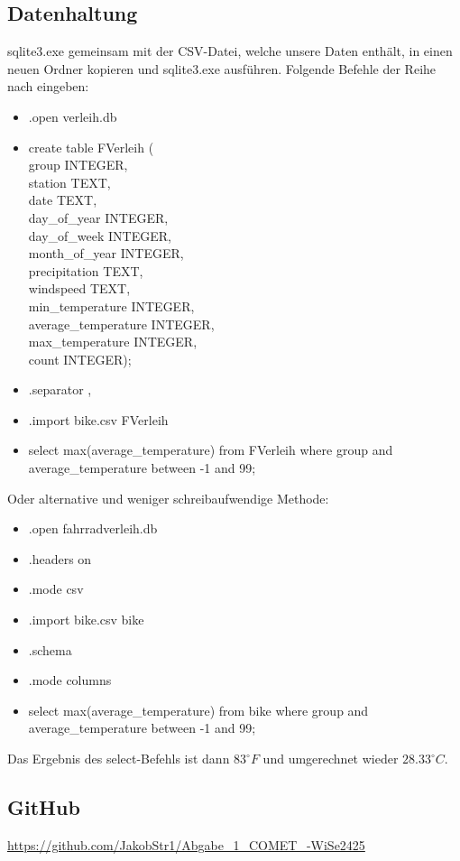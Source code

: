 \documentclass{article}
\begin{document}
\subsection{Datenhaltung}
sqlite3.exe gemeinsam mit der CSV-Datei, welche unsere Daten enthält, in einen neuen Ordner kopieren und  sqlite3.exe ausführen. Folgende Befehle der Reihe nach eingeben:
\begin{itemize}
    \item .open verleih.db
    \item create table FVerleih (\\ \dq group\dq{} INTEGER, \\station TEXT, \\date TEXT, \\day\_of\_year INTEGER, \\day\_of\_week INTEGER, \\month\_of\_year INTEGER, \\precipitation TEXT, \\windspeed TEXT, \\min\_temperature INTEGER, \\average\_temperature INTEGER, \\max\_temperature INTEGER, \\count INTEGER);
    \item .separator ,
    \item .import bike.csv FVerleih
    \item select max(average\_temperature) from FVerleih where \dq group and average\_temperature between -1 and 99;
\end{itemize} 
Oder alternative und weniger schreibaufwendige Methode:
\begin{itemize}
    \item .open fahrradverleih.db
    \item .headers on
    \item .mode csv
    \item .import bike.csv bike
    \item .schema
    \item .mode columns
    \item select max(average\_temperature) from bike where \dq group and \\average\_temperature between -1 and 99;
\end{itemize}
Das Ergebnis des select-Befehls ist dann ${83}^\circ F$ und umgerechnet wieder ${28.33}^\circ C$.
\subsection{GitHub}
\url{https://github.com/JakobStr1/Abgabe_1_COMET_-WiSe2425}


\newpage
 

\end{document}
